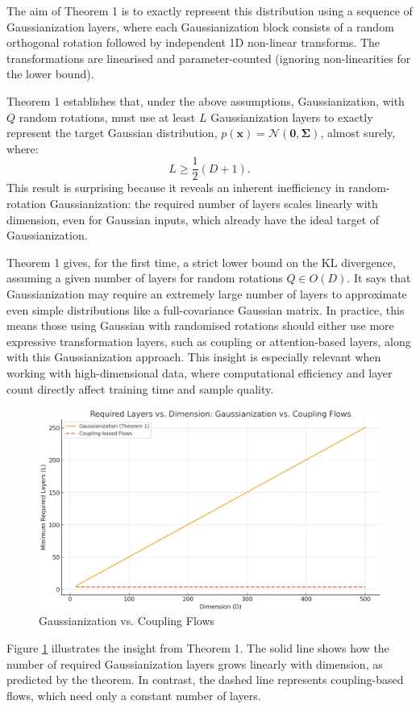 \documentclass[11pt]{report} %
\begin{document}
The aim of Theorem 1 is to exactly represent this distribution using a sequence of Gaussianization layers, where each Gaussianization block consists of a random orthogonal rotation followed by independent 1D non-linear transforms. The transformations are linearised and parameter-counted (ignoring non-linearities for the lower bound).

Theorem 1 establishes that, under the above assumptions, Gaussianization, with $Q$ random rotations, must use at least $L$ Gaussianization layers to exactly represent the target Gaussian distribution, \( p(\mathbf{x})=\mathcal{N}(\mathbf{0}, \mathbf{\Sigma}) \), almost surely, where:
\[
L \geq \frac{1}{2}(D + 1).
\]
This result is surprising because it reveals an inherent inefficiency in random-rotation Gaussianization: the required number of layers scales linearly with dimension, even for Gaussian inputs, which already have the ideal target of Gaussianization. %

Theorem 1 gives, for the first time, a strict lower bound on the KL divergence, assuming a given number of layers for random rotations $Q\in O(D)$. It says that Gaussianization may require an extremely large number of layers to approximate even simple distributions like a full-covariance Gaussian matrix. In practice, this means those using Gaussian with randomised rotations should either use more expressive transformation layers, such as coupling or attention-based layers, along with this Gaussianization approach. %
This insight is especially relevant when working with high-dimensional data, where computational efficiency and layer count directly affect training time and sample quality.

\begin{figure}[H]
    \centering
    \includegraphics[width=0.55\linewidth]{Gaussianization vs. Coupling Flows.png}
    \caption{Gaussianization vs. Coupling Flows}
    \label{fig:Gaussianization vs. Coupling Flows}
\end{figure}
\noindent Figure \ref{fig:Gaussianization vs. Coupling Flows} illustrates the insight from Theorem 1. 
The solid line shows how the number of required Gaussianization layers grows linearly with dimension, as predicted by the theorem. In contrast, the dashed line represents coupling-based flows, which need only a constant number of layers. 
\end{document}
